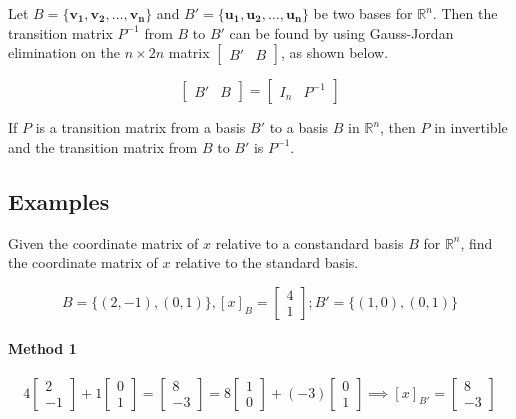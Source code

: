 \documentclass{report}
\begin{document}
\begin{tcolorbox}[title = Transition Matrix $B$ to $B'$]
	Let $B = \{ \bm{v_1}, \bm{v_2}, \hdots, \bm{v_n} \}$ and $B' = \{ \bm{u_1}, \bm{u_2}, \hdots, \bm{u_n} \}$ be two bases for $\mathbb{R}^n$. Then the transition matrix $P^{-1}$ from $B$ to $B'$ can be found by using Gauss-Jordan elimination on the $n \times 2n$ matrix $\begin{bmatrix} B' 	& B \end{bmatrix}$, as shown below.
	
	$$
	\begin{bmatrix} B' & B \end{bmatrix} = \begin{bmatrix} I_n & P^{-1} \end{bmatrix}
	$$
\end{tcolorbox} 

\begin{tcolorbox}[title = The Inverse of a Transition Matrix]
		If $P$ is a transition matrix from a basis $B'$ to a basis $B$ in $\mathbb{R}^n$, then $P$ in invertible and the transition matrix from $B$ to $B'$ is $P^{-1}$.
\end{tcolorbox}

\subsection{Examples}

\begin{tcolorbox}[colframe = lightred]
	Given the coordinate matrix of $x$ relative to a constandard basis $B$ for $\mathbb{R}^n$, find the coordinate matrix of $x$ relative to the standard basis.
	
	$$
	B = \{ (2,-1), (0,1) \}, [x]_B = \begin{bmatrix} 4 \\ 1 \end{bmatrix}; B' = \{ (1,0), (0,1)\}
	$$
\end{tcolorbox}

\paragraph{Method 1}

$$
4 \begin{bmatrix} 2 \\ - 1 \end{bmatrix} + 1 \begin{bmatrix} 0 \\ 1 \end{bmatrix}  = \begin{bmatrix} 8 \\ - 3 \end{bmatrix} = 8 \begin{bmatrix} 1 \\ 0 \end{bmatrix} + (-3) \begin{bmatrix} 0 \\ 1 \end{bmatrix} \implies [x]_{B'} = \begin{bmatrix} 8 \\ -3 \end{bmatrix}
$$
\end{document}
